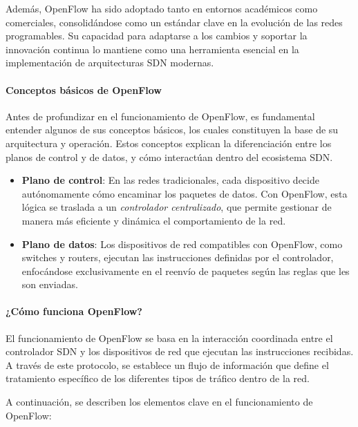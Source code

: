 {                Además, OpenFlow ha sido adoptado tanto en entornos académicos como comerciales, consolidándose como un estándar clave en la evolución de las redes programables. Su capacidad para adaptarse a los cambios y soportar la innovación continua lo mantiene como una herramienta esencial en la implementación de arquitecturas SDN modernas.
                
                \paragraph{Conceptos básicos de OpenFlow}
                    Antes de profundizar en el funcionamiento de OpenFlow, es fundamental entender algunos de sus conceptos básicos, los cuales constituyen la base de su arquitectura y operación. Estos conceptos explican la diferenciación entre los planos de control y de datos, y cómo interactúan dentro del ecosistema SDN.
                    
                    \begin{itemize}
                        \item \textbf{Plano de control}: En las redes tradicionales, cada dispositivo decide autónomamente cómo encaminar los paquetes de datos. Con OpenFlow, esta lógica se traslada a un \textit{controlador centralizado}, que permite gestionar de manera más eficiente y dinámica el comportamiento de la red.
                        
                        \item \textbf{Plano de datos}: Los dispositivos de red compatibles con OpenFlow, como switches y routers, ejecutan las instrucciones definidas por el controlador, enfocándose exclusivamente en el reenvío de paquetes según las reglas que les son enviadas.
                    \end{itemize}
                
                \paragraph{¿Cómo funciona OpenFlow?}
                    El funcionamiento de OpenFlow se basa en la interacción coordinada entre el controlador SDN y los dispositivos de red que ejecutan las instrucciones recibidas. A través de este protocolo, se establece un flujo de información que define el tratamiento específico de los diferentes tipos de tráfico dentro de la red.
                    
                    A continuación, se describen los elementos clave en el funcionamiento de OpenFlow:
                    
}
